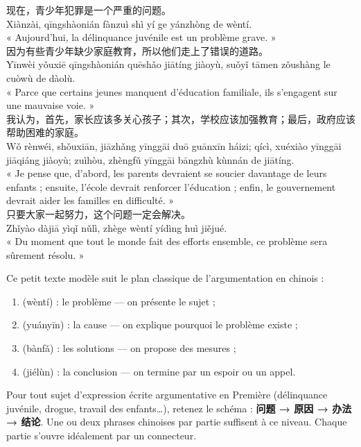 \documentclass[11pt]{article}
\newcommand{\cle}[1]{{\popxbold\color{popdark}#1}}
\newcommand{\zh}[1]{\ifmmode\text{#1}\else{#1}\fi}
\begin{document}
\begin{textebox}
现在，青少年犯罪是一个严重的问题。\\
Xiànzài, qīngshàonián fànzuì shì yí ge yánzhòng de wèntí.\\
« Aujourd'hui, la délinquance juvénile est un problème grave. »\\[4pt]
因为有些青少年缺少家庭教育，所以他们走上了错误的道路。\\
Yīnwèi yǒuxiē qīngshàonián quēshǎo jiātíng jiàoyù, suǒyǐ tāmen zǒushàng le cuòwù de dàolù.\\
« Parce que certains jeunes manquent d'éducation familiale, ils s'engagent sur une mauvaise voie. »\\[4pt]
我认为，首先，家长应该多关心孩子；其次，学校应该加强教育；最后，政府应该帮助困难的家庭。\\
Wǒ rènwéi, shǒuxiān, jiāzhǎng yīnggāi duō guānxīn háizi; qícì, xuéxiào yīnggāi jiāqiáng jiàoyù; zuìhòu, zhèngfǔ yīnggāi bāngzhù kùnnán de jiātíng.\\
« Je pense que, d'abord, les parents devraient se soucier davantage de leurs enfants ; ensuite, l'école devrait renforcer l'éducation ; enfin, le gouvernement devrait aider les familles en difficulté. »\\[4pt]
只要大家一起努力，这个问题一定会解决。\\
Zhǐyào dàjiā yìqǐ nǔlì, zhège wèntí yídìng huì jiějué.\\
« Du moment que tout le monde fait des efforts ensemble, ce problème sera sûrement résolu. »
\end{textebox}

\begin{definition}
Ce petit texte modèle suit le plan classique de l'argumentation en chinois :
\begin{enumerate}
\item \zh{问题} (wèntí) : le \cle{problème} — on présente le sujet ;
\item \zh{原因} (yuányīn) : la \cle{cause} — on explique pourquoi le problème existe ;
\item \zh{办法} (bànfǎ) : les \cle{solutions} — on propose des mesures ;
\item \zh{结论} (jiélùn) : la \cle{conclusion} — on termine par un espoir ou un appel.
\end{enumerate}
\end{definition}

\begin{aretenir}
Pour tout sujet d'expression écrite argumentative en Première (délinquance juvénile, drogue, travail des enfants…), retenez le schéma : \textbf{问题 → 原因 → 办法 → 结论}. Une ou deux phrases chinoises par partie suffisent à ce niveau. Chaque partie s'ouvre idéalement par un connecteur.
\end{aretenir}
\end{document}
